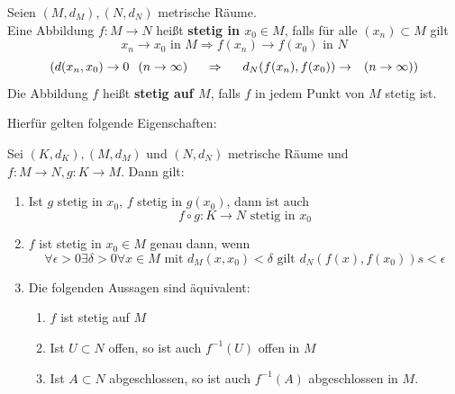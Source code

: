 \begin{definition} 
	Seien $(M, d_{M}), (N, d_{N})$ metrische Räume. \\
	Eine Abbildung $f: M \rightarrow N$ hei{\ss}t \textbf{stetig in $x_{0} \in M$}, falls für alle $(x_{n}) \subset M$ gilt
	\[ x_{n} \rightarrow x_{0} \text{ in } M \Rightarrow f(x_{n}) \rightarrow f(x_{0}) \text{ in } N \]
	\[ (d(x_{n}, x_{0}) \rightarrow 0 \hspace{0.25cm} (n \rightarrow \infty) \hspace{0.5cm} \Rightarrow \hspace{0.5cm} d_{N}(f(x_{n}), f(x_{0})) \rightarrow \hspace{0.25cm} (n \rightarrow \infty)) \]
	Die Abbildung $f$ hei{\ss}t \textbf{stetig auf $M$}, falls $f$ in jedem Punkt von $M$ stetig ist.
\end{definition}

Hierfür gelten folgende Eigenschaften:

\begin{prop}
	Sei $(K,d_{K}), (M, d_{M})$ und $(N, d_{N})$ metrische Räume und $f: M \rightarrow N, g: K \rightarrow M$. Dann gilt:
	\begin{enumerate}[label=\alph*\upshape)]
		\item Ist $g$ stetig in $x_{0}$, $f$ stetig in $g(x_{0})$, dann ist auch 
			\[ f \circ g: K \rightarrow N \text{ stetig in } x_{0} \]
		\item $f$ ist stetig in $x_{0} \in M$ genau dann, wenn 
			\[ \forall \epsilon > 0 \exists \delta > 0 \forall x \in M \text{ mit } d_{M}(x, x_{0}) < \delta \text{ gilt } d_{N}(f(x), f(x_{0}))s < \epsilon \]
		\item Die folgenden Aussagen sind äquivalent:
			\begin{enumerate}
				\item $f$ ist stetig auf $M$
				\item Ist $U \subset N$ offen, so ist auch $f^{-1}(U)$ offen in $M$
				\item Ist $A \subset N$ abgeschlossen, so ist auch $f^{-1}(A)$ abgeschlossen in $M$.
			\end{enumerate}
	\end{enumerate}	
	\begin{beweis}
	\end{beweis}
\end{prop}

